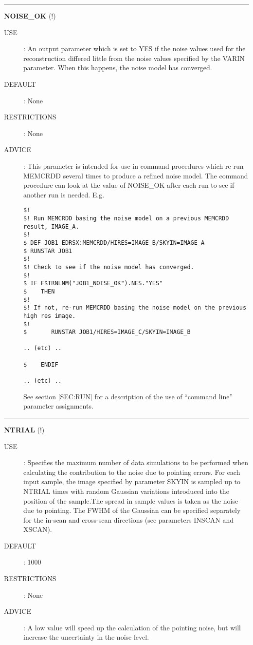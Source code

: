 \rule{\textwidth}{0.3mm}
{\Large {\bf NOISE\_OK} (!)}
\begin{description}
\item [USE]:
An output parameter which is set to YES if the noise values used for the 
reconstruction differed little from the noise values specified by the VARIN 
parameter. When this happens, the noise model has converged.
\item [DEFAULT]:
None
\item [RESTRICTIONS]:
None
\item [ADVICE]:
This parameter is intended for use in command procedures which re-run MEMCRDD 
several times to produce a refined noise model. The command procedure can look 
at the value of NOISE\_OK after each run to see if another run is needed. E.g.
\begin{verbatim}
$!
$! Run MEMCRDD basing the noise model on a previous MEMCRDD result, IMAGE_A.
$!
$ DEF JOB1 EDRSX:MEMCRDD/HIRES=IMAGE_B/SKYIN=IMAGE_A
$ RUNSTAR JOB1
$!
$! Check to see if the noise model has converged.
$!
$ IF F$TRNLNM("JOB1_NOISE_OK").NES."YES" 
$    THEN 
$!
$! If not, re-run MEMCRDD basing the noise model on the previous high res image.
$!
$       RUNSTAR JOB1/HIRES=IMAGE_C/SKYIN=IMAGE_B

.. (etc) ..

$    ENDIF

.. (etc) ..

\end{verbatim}
See section \ref {SEC:RUN} for a description of the use of ``command line'' 
parameter assignments.
\end {description}

\rule{\textwidth}{0.3mm}
{\Large {\bf NTRIAL} (!)}
\begin{description}
\item [USE]:
Specifies the maximum number of data simulations to be performed when 
calculating the contribution to the noise due to pointing errors. For each input 
sample, the image specified by parameter SKYIN is sampled up to NTRIAL times with 
random Gaussian variations introduced into the position of the sample.The 
spread in sample values is taken as the noise due to pointing. The FWHM of the 
Gaussian can be specified separately for the in-scan and cross-scan directions
(see parameters INSCAN and XSCAN).
\item [DEFAULT]:
1000
\item [RESTRICTIONS]:
None
\item [ADVICE]:
A low value will speed up the calculation of the pointing noise, but will 
increase the uncertainty in the noise level.
\end {description}

